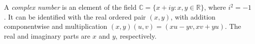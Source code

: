 
A \emph{complex number} is an element of the field $\mathbb C=\{x+iy:x,y\in\mathbb R\}$, where $i^2=-1$. It can be identified with the real ordered pair $(x,y)$, with addition componentwise and multiplication $(x,y)(u,v)=(xu-yv,xv+yu)$. The real and imaginary parts are $x$ and $y$, respectively.

